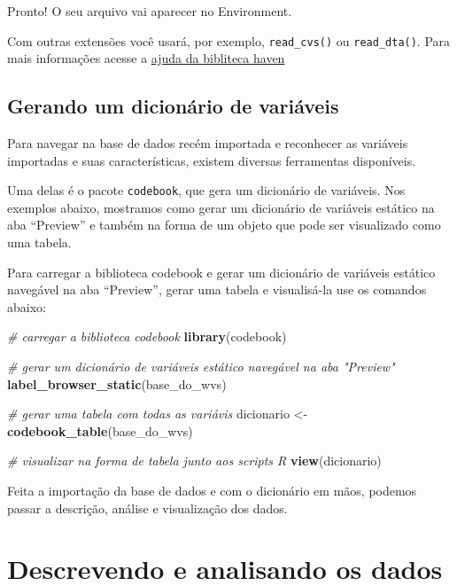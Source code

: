 \documentclass[
  10pt,
  brazil,
  a4paper,
  twoside, notitlepage, openright]{book}
\newenvironment{Shaded}{\begin{snugshade}}{\end{snugshade}}
\newcommand{\CommentTok}[1]{\textcolor[rgb]{0.56,0.35,0.01}{\textit{#1}}}
\newcommand{\KeywordTok}[1]{\textcolor[rgb]{0.13,0.29,0.53}{\textbf{#1}}}
\newcommand{\NormalTok}[1]{#1}
\newcommand{\StringTok}[1]{\textcolor[rgb]{0.31,0.60,0.02}{#1}}
\begin{document}
Pronto! O seu arquivo vai aparecer no Environment.

Com outras extensões você usará, por exemplo, \texttt{read\_cvs()} ou \texttt{read\_dta()}. Para mais informações acesse a \href{https://haven.tidyverse.org/}{ajuda da bibliteca haven}

\hypertarget{gerando-um-dicionuxe1rio-de-variuxe1veis}{%
\section{Gerando um dicionário de variáveis}\label{gerando-um-dicionuxe1rio-de-variuxe1veis}}

Para navegar na base de dados recém importada e reconhecer as variáveis importadas e suas características, existem diversas ferramentas disponíveis.

Uma delas é o pacote \texttt{codebook}, que gera um dicionário de variáveis. Nos exemplos abaixo, mostramos como gerar um dicionário de variáveis estático na aba ``Preview'' e também na forma de um objeto que pode ser visualizado como uma tabela.

Para carregar a biblioteca codebook e gerar um dicionário de variáveis estático navegável na aba ``Preview'', gerar uma tabela e visualisá-la use os comandos abaixo:

\begin{Shaded}
\begin{Highlighting}[]
\CommentTok{# carregar a biblioteca codebook}
\KeywordTok{library}\NormalTok{(codebook)}

\CommentTok{# gerar um dicionário de variáveis estático navegável na aba "Preview"}
\KeywordTok{label_browser_static}\NormalTok{(base_do_wvs)}

\CommentTok{# gerar uma tabela com todas as variávis}
\NormalTok{dicionario <-}\StringTok{ }\KeywordTok{codebook_table}\NormalTok{(base_do_wvs)}

\CommentTok{# visualizar na forma de tabela junto aos scripts R}
\KeywordTok{view}\NormalTok{(dicionario)}
\end{Highlighting}
\end{Shaded}

Feita a importação da base de dados e com o dicionário em mãos, podemos passar a descrição, análise e visualização dos dados.

\hypertarget{descrevendo-e-analisando-os-dados}{%
\chapter{Descrevendo e analisando os dados}\label{descrevendo-e-analisando-os-dados}}
\end{document}
